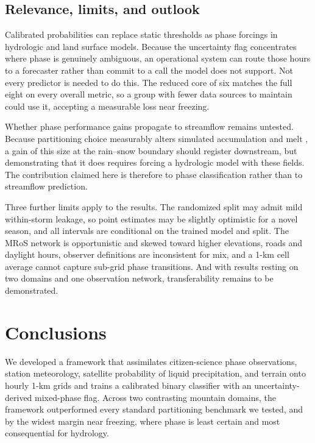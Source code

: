 \documentclass[twocol]{ametsocV6.1} %
\begin{document}
\subsection{Relevance, limits, and outlook}
\label{sec:limits}
Calibrated probabilities can replace static thresholds as phase
forcings in hydrologic and land surface models. Because the uncertainty
flag concentrates where phase is genuinely ambiguous, an operational
system can route those hours to a forecaster rather than commit to a
call the model does not support. Not every predictor is needed to do
this. The reduced core of six matches the full eight on every overall
metric, so a group with fewer data sources to maintain could use it,
accepting a measurable loss near freezing.

Whether phase performance gains propagate to streamflow remains untested. 
Because partitioning choice measurably alters simulated accumulation and melt
\citep{jennings2019sensitivity}, a gain of this size at the rain--snow
boundary should register downstream, but demonstrating that it does
requires forcing a hydrologic model with these fields. The contribution
claimed here is therefore to phase classification rather than to
streamflow prediction.

Three further limits apply to the results. The randomized split may
admit mild within-storm leakage, so point estimates may be slightly
optimistic for a novel season, and all intervals are conditional on the
trained model and split. The MRoS network is opportunistic and skewed
toward higher elevations, roads and daylight hours, observer definitions
are inconsistent for mix, and a 1-km cell average cannot capture
sub-grid phase transitions. And with results resting on two domains and
one observation network, transferability remains to be demonstrated.

\section{Conclusions}
\label{sec:conclusions}
We developed a framework that assimilates citizen-science phase
observations, station meteorology, satellite probability of liquid
precipitation, and terrain onto hourly 1-km grids and trains a
calibrated binary classifier with an uncertainty-derived mixed-phase
flag. Across two contrasting mountain domains, the framework
outperformed every standard partitioning benchmark we tested, and by the
widest margin near freezing, where phase is least certain and most
consequential for hydrology.
\end{document}
